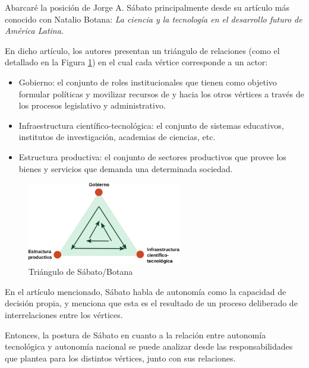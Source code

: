 Abarcaré la posición de Jorge A. Sábato principalmente desde su artículo más conocido con Natalio Botana: \textit{La ciencia y
la tecnología en el desarrollo futuro de América Latina}.

En dicho artículo, los autores presentan un triángulo de relaciones (como el detallado en la Figura \ref{triangulo}) en el cual cada vértice
corresponde a un actor:
\begin{itemize}
    \item Gobierno: el conjunto de roles institucionales que tienen como objetivo formular políticas y movilizar recursos de y hacia los otros vértices a través de los procesos legislativo y administrativo.
    \item Infraestructura científico-tecnológica: el conjunto de sistemas educativos, institutos de investigación, academias de ciencias, etc.
    \item Estructura productiva: el conjunto de sectores productivos que provee los bienes y servicios que demanda una determinada sociedad.
\end{itemize}

\begin{figure}[H]
    \centering
    \includegraphics[width=0.6\textwidth]{imagenes/sabato.png}
    \caption{Triángulo de Sábato/Botana}\label{triangulo}
\end{figure}


En el artículo mencionado, Sábato habla de autonomía como la capacidad de decisión propia, y menciona que esta es el resultado de un proceso deliberado de interrelaciones entre los vértices.

Entonces, la postura de Sábato en cuanto a la relación entre autonomía tecnológica y
autonomía nacional se puede analizar desde las responsabilidades que plantea para los distintos vértices, junto con sus relaciones.

